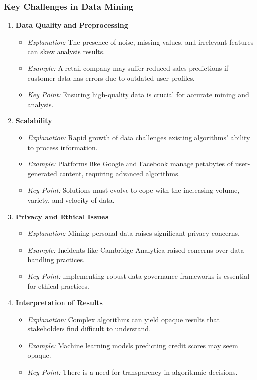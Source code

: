\documentclass[aspectratio=169]{beamer}
\begin{document}
\begin{frame}[fragile]
    \frametitle{Key Challenges in Data Mining}
    \begin{enumerate}
        \item \textbf{Data Quality and Preprocessing}
            \begin{itemize}
                \item \textit{Explanation:} The presence of noise, missing values, and irrelevant features can skew analysis results.
                \item \textit{Example:} A retail company may suffer reduced sales predictions if customer data has errors due to outdated user profiles.
                \item \textit{Key Point:} Ensuring high-quality data is crucial for accurate mining and analysis.
            \end{itemize}

        \item \textbf{Scalability}
            \begin{itemize}
                \item \textit{Explanation:} Rapid growth of data challenges existing algorithms' ability to process information.
                \item \textit{Example:} Platforms like Google and Facebook manage petabytes of user-generated content, requiring advanced algorithms.
                \item \textit{Key Point:} Solutions must evolve to cope with the increasing volume, variety, and velocity of data.
            \end{itemize}

        \item \textbf{Privacy and Ethical Issues}
            \begin{itemize}
                \item \textit{Explanation:} Mining personal data raises significant privacy concerns.
                \item \textit{Example:} Incidents like Cambridge Analytica raised concerns over data handling practices.
                \item \textit{Key Point:} Implementing robust data governance frameworks is essential for ethical practices.
            \end{itemize}
        
        \item \textbf{Interpretation of Results}
            \begin{itemize}
                \item \textit{Explanation:} Complex algorithms can yield opaque results that stakeholders find difficult to understand.
                \item \textit{Example:} Machine learning models predicting credit scores may seem opaque.
                \item \textit{Key Point:} There is a need for transparency in algorithmic decisions.
            \end{itemize}
    \end{enumerate}
\end{frame}
\end{document}
